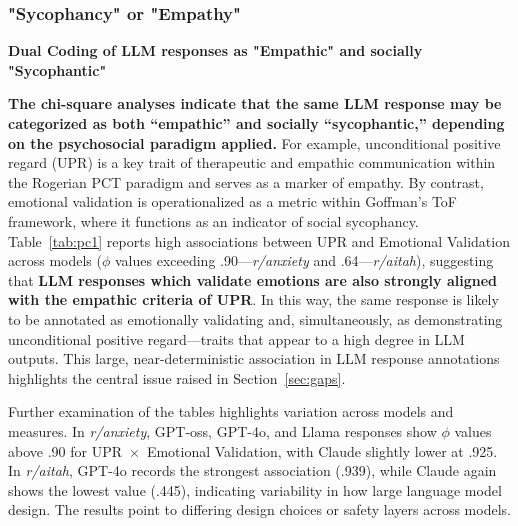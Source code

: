 

\medskip

\subsubsection{"Sycophancy" or "Empathy"}
\textbf{Dual Coding of LLM responses as "Empathic" and socially "Sycophantic"}


\textbf{The chi-square analyses indicate that the same LLM response may be categorized as both ``empathic'' and socially ``sycophantic,'' depending on the psychosocial paradigm applied.} For example, unconditional positive regard (UPR) is a key trait of therapeutic and empathic communication within the Rogerian PCT paradigm and serves as a marker of empathy. By contrast, emotional validation is operationalized as a metric within Goffman's ToF framework, where it functions as an indicator of social sycophancy. Table~\ref{tab:pc1} reports high associations between UPR and Emotional Validation across models ($\phi$ values exceeding .90---\textit{r/anxiety} and .64---\textit{r/aitah}), suggesting that \textbf{LLM responses which validate emotions are also strongly aligned with the empathic criteria of UPR}. In this way, the same response is likely to be annotated as emotionally validating and, simultaneously, as demonstrating unconditional positive regard---traits that appear to a high degree in LLM outputs. This large, near-deterministic association in LLM response annotations highlights the central issue raised in Section~\ref{sec:gaps}.

\medskip

\noindent
Further examination of the tables highlights variation across models and measures. In \textit{r/anxiety}, GPT-oss, GPT-4o, and Llama responses show $\phi$ values above .90 for UPR~$\times$~Emotional Validation, with Claude slightly lower at .925. In \textit{r/aitah}, GPT-4o records the strongest association (.939), while Claude again shows the lowest value (.445), indicating variability in how large language model design. The results point to differing design choices or safety layers across models.

\medskip


